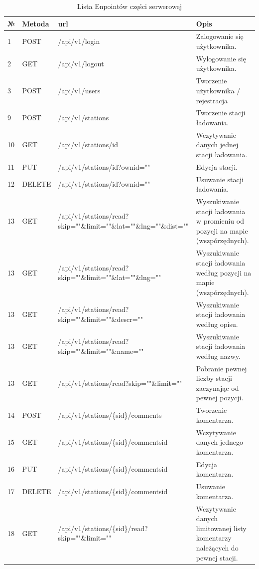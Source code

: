 \begin{table}[htb] \small
    \caption{Lista Enpointów części serwerowej}
    \label{tab:endpoints_front}
    \begin{tabularx}{\linewidth}{| m{0.45cm} | m{1.5cm} | m{6cm} | X |}
    \hline
    № & Metoda & url & Opis \\
    \hline
    1 & POST & /api/v1/login & Zalogowanie się użytkownika. \\
    \hline
    2 & GET & /api/v1/logout & Wylogowanie się użytkownika. \\
    \hline
    3 & POST & /api/v1/users & Tworzenie użytkownika / rejestracja \\
    \hline
    9 & POST & /api/v1/stations & Tworzenie stacji ładowania. \\
    \hline
    10 & GET & /api/v1/stations/{id} & Wczytywanie danych jednej stacji ładowania. \\
    \hline
    11 & PUT & /api/v1/stations/{id}?ownid="" & Edycja stacji. \\
    \hline
    12 & DELETE & /api/v1/stations/{id}?ownid="" & Usuwanie stacji ładowania. \\
    \hline
    13 & GET & /api/v1/stations/read?skip=""\&limit=""\&lat=""\&lng=""\&dist="" & Wyszukiwanie stacji ładowania w promieniu od pozycji na mapie (wszpórzędnych). \\
    \hline
    13 & GET & /api/v1/stations/read?skip=""\&limit=""\&lat=""\&lng="" & Wyszukiwanie stacji ładowania według pozycji na mapie (wszpórzędnych). \\
    \hline
    13 & GET & /api/v1/stations/read?skip=""\&limit=""\&descr="" & Wyszukiwanie stacji ładowania według opisu. \\
    \hline
    13 & GET & /api/v1/stations/read?skip=""\&limit=""\&name="" & Wyszukiwanie stacji ładowania według nazwy. \\
    \hline
    13 & GET & /api/v1/stations/read?skip=""\&limit="" & Pobranie pewnej liczby stacji zaczynając od pewnej pozycji. \\
    \hline
    14 & POST & /api/v1/stations/\{sid\}/comments & Tworzenie komentarza. \\
    \hline
    15 & GET & /api/v1/stations/\{sid\}/comments{id} & Wczytywanie danych jednego komentarza. \\
    \hline
    16 & PUT & /api/v1/stations/\{sid\}/comments{id} & Edycja komentarza. \\
    \hline
    17 & DELETE & /api/v1/stations/\{sid\}/comments{id} & Usuwanie komentarza. \\
    \hline
    18 & GET & /api/v1/stations/\{sid\}/read?skip=""\&limit="" & Wczytywanie danych limitowanej listy komentarzy należących do pewnej stacji. \\
    \hline
    \end{tabularx}
\end{table}

